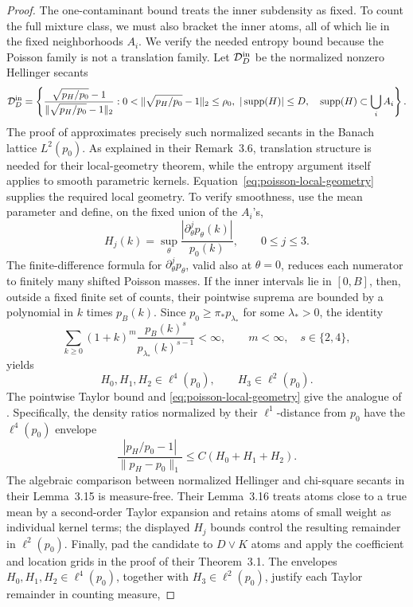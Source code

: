 \documentclass[11pt]{article}
\theoremstyle{definition}
\numberwithin{equation}{section}
\DeclareMathOperator{\supp}{supp}
\begin{document}
\begin{proof}
The one-contaminant bound treats the inner subdensity as fixed. To count the
full mixture class, we must also bracket the inner atoms, all of which lie in
the fixed neighborhoods \(A_i\). We verify the needed entropy bound because
the Poisson family is not a translation family. Let
\(\mathcal D_D^{\rm in}\) be the normalized
nonzero Hellinger secants
\[
 \mathcal D_D^{\rm in}
 =\left\{
   \frac{\sqrt{p_H/p_0}-1}
        {\|\sqrt{p_H/p_0}-1\|_2}:
   0<\|\sqrt{p_H/p_0}-1\|_2\le\rho_0,
   \ |\supp(H)|\le D,\quad
   \supp(H)\subset\bigcup_iA_i
 \right\}.
\]
The proof of \cite[Theorem~3.1]{gassiatVanHandel2014} approximates precisely
such normalized secants in the Banach lattice \(L^2(p_0)\). As explained in
their Remark~3.6, translation structure is needed for their local-geometry
theorem, while the entropy argument itself applies to smooth parametric
kernels. Equation~\eqref{eq:poisson-local-geometry} supplies the required
local geometry. To verify smoothness, use the mean parameter and define, on
the fixed union of the \(A_i\)'s,
\[
 H_j(k)=\sup_\theta
       \frac{|\partial_\theta^jp_\theta(k)|}{p_0(k)},
 \qquad 0\le j\le3.
\]
The finite-difference formula for \(\partial_\theta^jp_\theta\), valid also
at \(\theta=0\), reduces each numerator to finitely many shifted Poisson
masses. If the inner intervals lie in \([0,B]\), then, outside a fixed
finite set of counts, their pointwise suprema are bounded by a polynomial
in \(k\) times \(p_B(k)\). Since
\(p_0\ge\pi_*p_{\lambda_*}\) for some \(\lambda_*>0\), the identity
\[
 \sum_{k\ge0}(1+k)^m
 \frac{p_B(k)^s}{p_{\lambda_*}(k)^{s-1}}<\infty,
 \qquad m<\infty,\quad s\in\{2,4\},
\]
yields
\[
 H_0,H_1,H_2\in\ell^4(p_0),
 \qquad H_3\in\ell^2(p_0).
\]
The pointwise Taylor bound and \eqref{eq:poisson-local-geometry} give the
analogue of \cite[Lemma~3.13]{gassiatVanHandel2014}. Specifically, the
density ratios normalized by their \(\ell^1\)-distance from \(p_0\) have
the \(\ell^4(p_0)\) envelope
\[
 \frac{|p_H/p_0-1|}{\|p_H-p_0\|_1}
 \le C(H_0+H_1+H_2).
\]
The algebraic comparison between normalized Hellinger and chi-square
secants in their Lemma~3.15 is measure-free. Their Lemma~3.16 treats atoms
close to a true mean by a second-order Taylor expansion and retains atoms of
small weight as individual kernel terms; the displayed \(H_j\) bounds
control the resulting remainder in \(\ell^2(p_0)\). Finally, pad the
candidate to \(D\vee K\) atoms and apply the coefficient and location grids
in the proof of their Theorem~3.1. The envelopes
\(H_0,H_1,H_2\in\ell^4(p_0)\), together with
\(H_3\in\ell^2(p_0)\), justify each Taylor remainder in counting measure,

\end{proof}
\end{document}
